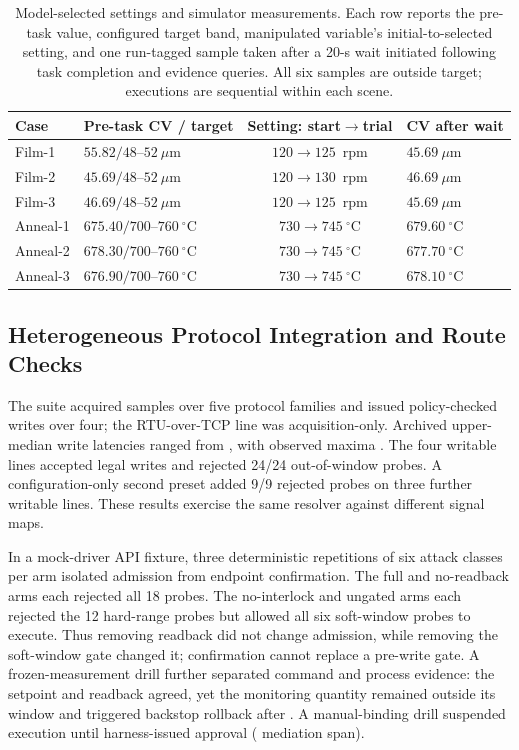 \begin{table}[!t]
\centering
\caption{Model-selected settings and simulator measurements. Each row
reports the pre-task value, configured target band, manipulated variable's
initial-to-selected setting, and one run-tagged sample taken after a 20-s wait
initiated following task completion and evidence queries. All six samples are
outside target; executions are sequential within each scene.}
\label{tab:q8}
\footnotesize
\setlength{\tabcolsep}{2.5pt}
\begin{tabularx}{\columnwidth}{@{}lXcX@{}}
\toprule
Case & Pre-task CV / target & Setting: start$\to$trial & CV after wait \\
\midrule
Film-1 & $55.82/48$--$52~\mu$m & $120\to125$~rpm & $45.69~\mu$m \\
Film-2 & $45.69/48$--$52~\mu$m & $120\to130$~rpm & $46.69~\mu$m \\
Film-3 & $46.69/48$--$52~\mu$m & $120\to125$~rpm & $45.69~\mu$m \\
Anneal-1 & $675.40/700$--$760~^{\circ}$C & $730\to745~^{\circ}$C & $679.60~^{\circ}$C \\
Anneal-2 & $678.30/700$--$760~^{\circ}$C & $730\to745~^{\circ}$C & $677.70~^{\circ}$C \\
Anneal-3 & $676.90/700$--$760~^{\circ}$C & $730\to745~^{\circ}$C & $678.10~^{\circ}$C \\
\bottomrule
\end{tabularx}
\end{table}

\subsection{Heterogeneous Protocol Integration and Route Checks}
\label{sec:protocol}
The suite acquired \resDaqSamples{} samples over five protocol families and
issued policy-checked writes over four; the RTU-over-TCP line was
acquisition-only.
Archived upper-median write latencies ranged from \resPfiftyRange{}, with observed maxima
\resPninetyfiveRange{}. The four writable lines accepted legal writes and
rejected 24/24 out-of-window probes. A configuration-only second preset
added 9/9 rejected probes on three further writable lines. These results
exercise the same resolver against different signal maps.

In a mock-driver API fixture, three deterministic repetitions of six attack
classes per arm isolated admission from endpoint confirmation. The full and
no-readback arms each rejected all 18 probes. The no-interlock and ungated
arms each rejected the 12 hard-range probes but allowed all six soft-window
probes to execute. Thus removing readback did not change admission, while
removing the soft-window gate changed it; confirmation cannot replace a
pre-write gate. A frozen-measurement drill further separated command and
process evidence: the setpoint and readback agreed, yet the monitoring
quantity remained outside its window and triggered backstop rollback after
\resBackstop{}. A manual-binding drill suspended execution until
harness-issued approval (\resHitlLatency{} mediation span).


